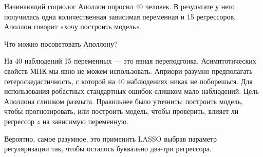 \begin{problem}
Начинающий социолог Аполлон опросил 40 человек. 
В результате у него получилась одна количественная зависимая переменная и 15 регрессоров.
Аполлон говорит «хочу построить модель». 

Что можно посоветовать Аполлону?
\begin{sol}
На 40 наблюдений 15 переменных — это явная переподгонка. Асимптотических свойств МНК 
мы явно не можем использовать. Априори разумно предполагать гетероскедастичность, 
с которой на 40 наблюдениях никак не поборешься. Для использования робастных стандартных ошибок
слишком мало наблюдений. Цель Аполлона слишком размыта. Правильнее было уточнить:
построить модель, чтобы прогнозировать, или построить модель, чтобы проверить,
влияет ли регрессор $z$ на зависимую переменную. 

Вероятно, самое разумное, это применить LASSO выбрав параметр регуляризации так, 
чтобы осталось буквально два-три регрессора. 
\end{sol}
\end{problem}
  


